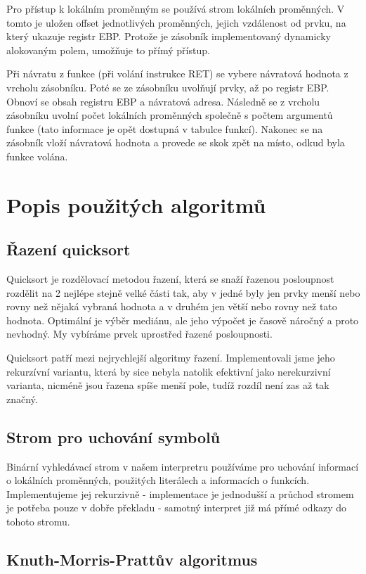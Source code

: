 \documentclass[a4paper,11pt,titlepage]{article}
\begin{document}
Pro přístup k lokálním proměnným se používá strom lokálních pro\-měn\-ných. V tomto je uložen offset jednotlivých proměnných, jejich vzdálenost od prvku, na který ukazuje registr EBP. Protože je zásobník implementovaný dynamicky alokovaným polem, umožňuje to přímý přístup.


Při návratu z funkce (při volání instrukce RET) se vybere návratová hodnota z vrcholu zásobníku. Poté se ze zásobníku uvolňují prvky, až po registr EBP. Obnoví se obsah registru EBP a návratová adresa. Následně se z vrcholu zásobníku uvolní počet lokálních proměnných společně s počtem argumentů funkce (tato informace je opět dostupná v tabulce funkcí). Nakonec se na zásobník vloží návratová hodnota a provede se skok zpět na místo, odkud byla funkce volána.

\section{Popis použitých algoritmů}

\subsection{Řazení quicksort}

Quicksort je rozdělovací metodou řazení, která se snaží řazenou posloupnost rozdělit na 2 nejlépe stejně velké části tak, aby v jedné byly jen prvky menší nebo rovny než nějaká vybraná hodnota a v druhém jen větší nebo rovny než tato hodnota. Optimální je výběr mediánu, ale jeho výpočet je časově náročný a proto nevhodný. My vybíráme prvek uprostřed řazené posloupnosti. 

Quicksort patří mezi nejrychlejší algoritmy řazení. Implementovali jsme jeho rekurzívní variantu, která by sice nebyla natolik efektivní jako nerekurzivní varianta, nicméně jsou řazena spíše menší pole, tudíž rozdíl není zas až tak značný.

\subsection{Strom pro uchování symbolů}

Binární vyhledávací strom v našem interpretru používáme pro u\-cho\-vá\-ní informací o lokálních proměnných, použitých literálech a informacích o funk\-cích. Implementujeme jej rekurzivně - implementace je jednodušší a průchod stromem je potřeba pouze v dobře překladu - samotný interpret již má přímé odkazy do tohoto stromu.

\subsection{Knuth-Morris-Prattův algoritmus}
\end{document}
